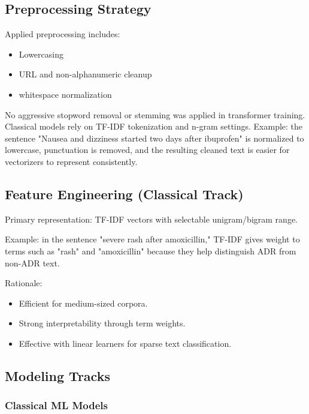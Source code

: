 \documentclass[11pt]{article}
\begin{document}
\subsection{Preprocessing Strategy}

Applied preprocessing includes:


\begin{itemize}
  \item Lowercasing
  \item URL and non-alphanumeric cleanup
  \item whitespace normalization
\end{itemize}

No aggressive stopword removal or stemming was applied in transformer training. Classical models rely on TF-IDF tokenization and n-gram settings. Example: the sentence "Nausea and dizziness started two days after ibuprofen" is normalized to lowercase, punctuation is removed, and the resulting cleaned text is easier for vectorizers to represent consistently.


\subsection{Feature Engineering (Classical Track)}

Primary representation: TF-IDF vectors with selectable unigram/bigram range.


Example: in the sentence "severe rash after amoxicillin," TF-IDF gives weight to terms such as "rash" and "amoxicillin" because they help distinguish ADR from non-ADR text.


Rationale:


\begin{itemize}
  \item Efficient for medium-sized corpora.
  \item Strong interpretability through term weights.
  \item Effective with linear learners for sparse text classification.
\end{itemize}

\subsection{Modeling Tracks}

\subsubsection{Classical ML Models}
\end{document}
